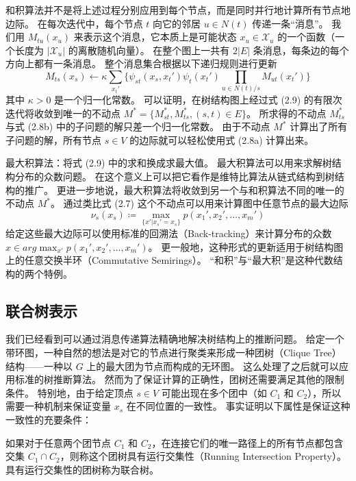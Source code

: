 和积算法并不是将上述过程分别应用到每个节点，而是同时并行地计算所有节点地边际。
在每次迭代中，每个节点 $t$ 向它的邻居 $u \in N(t)$ 传递一条“消息”。
我们用 $M_{tu}(x_u)$ 来表示这个消息，它本质上是可能状态 $x_u \in \mathcal{X}_u$ 的一个函数（一个长度为 $|\mathcal{X}_u|$ 的离散随机向量）。
在整个图上一共有 $2|E|$ 条消息，每条边的每个方向上都有一条消息。
整个消息集合根据以下递归规则进行更新
\begin{equation}
    M_{ts}(x_s) \leftarrow \kappa\sum_{x_t'}\{\psi_{st}(x_s, x_t')\psi_t(x_t')\prod_{u \in N(t)/s}M_{ut}(x_t')\}
\end{equation}
其中 $\kappa > 0$ 是一个归一化常数。
可以证明，在树结构图上经过式 (2.9) 的有限次迭代将收敛到唯一的不动点 $M^* = \{M_{st}^*, M_{ts}^*, (s, t) \in E\}$。
所求得的不动点 $M_{ts}^*$ 与式 (2.8b) 中的子问题的解只差一个归一化常数。
由于不动点 $M^*$ 计算出了所有子问题的解，所有节点 $s \in V$ 的边际就可以轻松使用式 (2.8a) 计算出来。

最大积算法：将式 (2.9) 中的求和换成求最大值。
最大积算法可以用来求解树结构分布的众数问题。
在这个意义上可以把它看作是维特比算法从链式结构到树结构的推广。
更进一步地说，最大积算法将收敛到另一个与和积算法不同的唯一的不动点 $M^*$。
通过类比式 (2.7) 这个不动点可以用来计算图中任意节点的最大边际
\begin{equation}
    \nu_s(x_s) \coloneqq \max_{\{x'|x_s' = x_s\}}p(x_1', x_2', \dots, x_m')
\end{equation}
给定这些最大边际可以使用标准的回溯法（Back-tracking）来计算分布的众数 $\hat{x} \in arg\max_{x'}p(x_1', x_2', \dots, x_m')$。
更一般地，这种形式的更新适用于树结构图上的任意交换半环（Commutative Semirings）。
“和积”与“最大积”是这种代数结构的两个特例。

\subsection{联合树表示}

我们已经看到可以通过消息传递算法精确地解决树结构上的推断问题。
给定一个带环图，一种自然的想法是对它的节点进行聚类来形成一种团树（Clique Tree）结构——一种以 $G$ 上的最大团为节点而构成的无环图。
这么处理了之后就可以应用标准的树推断算法。
然而为了保证计算的正确性，团树还需要满足其他的限制条件。
特别地，由于给定顶点 $s \in V$ 可能出现在多个团中（如 $C_1$ 和 $C_2$），所以需要一种机制来保证变量 $x_s$ 在不同位置的一致性。
事实证明以下属性是保证这种一致性的充要条件：

\begin{tcolorbox}
\begin{defn}
    如果对于任意两个团节点 $C_1$ 和 $C_2$，在连接它们的唯一路径上的所有节点都包含交集 $C_1 \cap C_2$，则称这个团树具有运行交集性（Running Intersection Property）。
    具有运行交集性的团树称为联合树。
\end{defn}
\end{tcolorbox}

